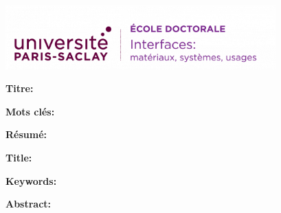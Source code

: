 \thispagestyle{empty}

\noindent 
\includegraphics[height=2.45cm]{ed-interfaces.png}
\vspace{1cm}

\small

\begin{mdframed}[linecolor=Prune,linewidth=1]
	
	\textbf{Titre:} \frenchTitle
	
	\vspace{1mm} \noindent
	\textbf{Mots clés:} \frenchKeyWords 
	
	\begin{multicols}{2}
		\textbf{Résumé:} \\
		\frenchAbstract
	\end{multicols}
	
\end{mdframed}

\vspace{1cm}
\Needspace{12cm}

\begin{mdframed}[linecolor=Prune,linewidth=1]
	
	\textbf{Title:} \englishTitle
	
	\vspace{1mm} \noindent
	\textbf{Keywords:} \englishKeyWords
	
	\begin{multicols}{2}
		\textbf{Abstract:} \\
		\englishAbstract
	\end{multicols}
\end{mdframed}

